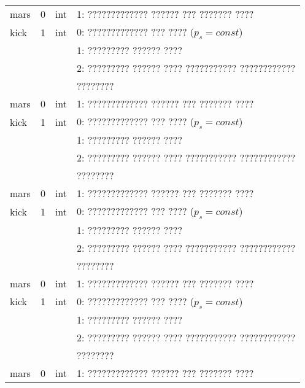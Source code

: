 \begin{longtable}[c]{|l|c|l|l|}
    mars     & 0      & int & 1: ????????????? ?????? ??? ??????? ????          \\
    kick     & 1      & int & 0: ????????????? ??? ???? (\(p_s = const\))       \\
             &        &     & 1: ????????? ?????? ????                          \\
             &        &     & 2: ????????? ?????? ???? ??????????? ???????????? \\
             &        &     & ????????                                          \\
    mars     & 0      & int & 1: ????????????? ?????? ??? ??????? ????          \\
    kick     & 1      & int & 0: ????????????? ??? ???? (\(p_s = const\))       \\
             &        &     & 1: ????????? ?????? ????                          \\
             &        &     & 2: ????????? ?????? ???? ??????????? ???????????? \\
             &        &     & ????????                                          \\
    mars     & 0      & int & 1: ????????????? ?????? ??? ??????? ????          \\
    kick     & 1      & int & 0: ????????????? ??? ???? (\(p_s = const\))       \\
             &        &     & 1: ????????? ?????? ????                          \\
             &        &     & 2: ????????? ?????? ???? ??????????? ???????????? \\
             &        &     & ????????                                          \\
    mars     & 0      & int & 1: ????????????? ?????? ??? ??????? ????          \\
    kick     & 1      & int & 0: ????????????? ??? ???? (\(p_s = const\))       \\
             &        &     & 1: ????????? ?????? ????                          \\
             &        &     & 2: ????????? ?????? ???? ??????????? ???????????? \\
             &        &     & ????????                                          \\
    mars     & 0      & int & 1: ????????????? ?????? ??? ??????? ????          \\
\end{longtable}
\normalsize%
\endgroup
